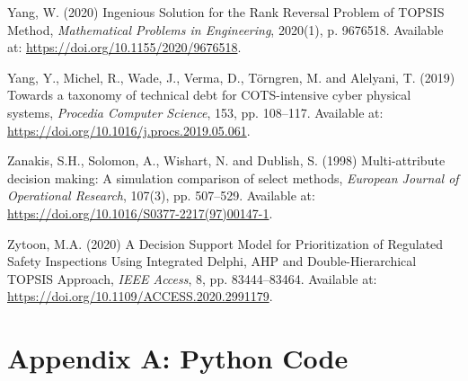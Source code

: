 \documentclass[
  12pt,
  letterpaper,
  12pt,
  oneside,
  english,
  onehalfspacing,
  headsepline]{MastersDoctoralThesis}
\newlength{\cslhangindent}
\newenvironment{CSLReferences}[2] %
 {\begin{list}{}{%
  \setlength{\itemindent}{0pt}
  \setlength{\leftmargin}{0pt}
  \setlength{\parsep}{0pt}
  \ifodd #1
   \setlength{\leftmargin}{\cslhangindent}
   \setlength{\itemindent}{-1\cslhangindent}
  \fi
  \setlength{\itemsep}{#2\baselineskip}}}
 {\end{list}}
\begin{document}
\begin{CSLReferences}{0}{1}
Yang, W. (2020) \textquotesingle Ingenious {Solution} for the {Rank
Reversal Problem} of {TOPSIS Method}\textquotesingle, \emph{Mathematical
Problems in Engineering}, 2020(1), p. 9676518. Available at:
\url{https://doi.org/10.1155/2020/9676518}.

Yang, Y., Michel, R., Wade, J., Verma, D., Törngren, M. and Alelyani, T.
(2019) \textquotesingle Towards a taxonomy of technical debt for
{COTS-intensive} cyber physical systems\textquotesingle, \emph{Procedia
Computer Science}, 153, pp. 108--117. Available at:
\url{https://doi.org/10.1016/j.procs.2019.05.061}.

Zanakis, S.H., Solomon, A., Wishart, N. and Dublish, S. (1998)
\textquotesingle Multi-attribute decision making: {A} simulation
comparison of select methods\textquotesingle, \emph{European Journal of
Operational Research}, 107(3), pp. 507--529. Available at:
\url{https://doi.org/10.1016/S0377-2217(97)00147-1}.

Zytoon, M.A. (2020) \textquotesingle A {Decision Support Model} for
{Prioritization} of {Regulated Safety Inspections Using Integrated
Delphi}, {AHP} and {Double-Hierarchical TOPSIS
Approach}\textquotesingle, \emph{IEEE Access}, 8, pp. 83444--83464.
Available at: \url{https://doi.org/10.1109/ACCESS.2020.2991179}.

\end{CSLReferences}

\cleardoublepage
{}
{}
\appendix

\chapter{Appendix A: Python Code}\label{appendix-a-python-code}
\end{document}
